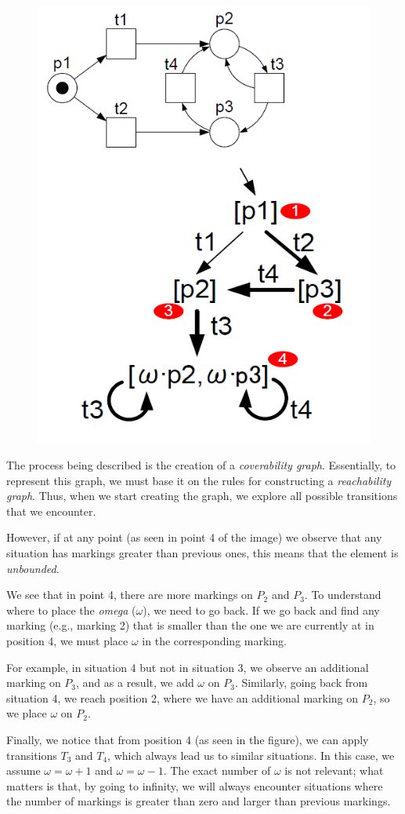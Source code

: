     \begin{figure} [h]
        \centering
        \includegraphics[width=0.5\linewidth]{capitolo 4/coverability graph.png}
    \end{figure}
    The process being described is the creation of a \textit{coverability graph}. Essentially, to represent this graph, we must base it on the rules for constructing a \textit{reachability graph}. Thus, when we start creating the graph, we explore all possible transitions that we encounter.
    
    However, if at any point (as seen in point 4 of the image) we observe that any situation has markings greater than previous ones, this means that the element is \textit{unbounded}.
    
    We see that in point 4, there are more markings on $P_2$ and $P_3$. To understand where to place the \textit{omega} ($\omega$), we need to go back. If we go back and find any marking (e.g., marking 2) that is smaller than the one we are currently at in position 4, we must place $\omega$ in the corresponding marking. 
    
    For example, in situation 4 but not in situation 3, we observe an additional marking on $P_3$, and as a result, we add $\omega$ on $P_3$. Similarly, going back from situation 4, we reach position 2, where we have an additional marking on $P_2$, so we place $\omega$ on $P_2$.
    
    Finally, we notice that from position 4 (as seen in the figure), we can apply transitions $T_3$ and $T_4$, which always lead us to similar situations. In this case, we assume $\omega = \omega + 1$ and $\omega = \omega - 1$. The exact number of $\omega$ is not relevant; what matters is that, by going to infinity, we will always encounter situations where the number of markings is greater than zero and larger than previous markings.
    

